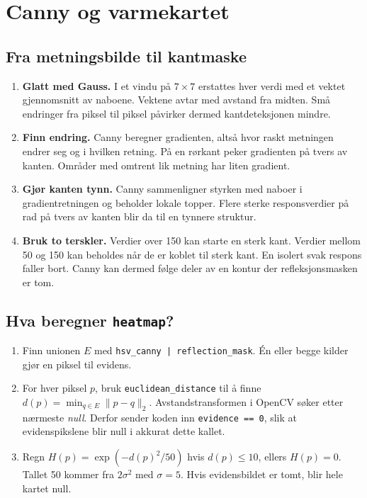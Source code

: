 \documentclass[11pt,a4paper]{article}
\newcommand{\code}[1]{\texttt{#1}}
\newcommand{\norm}[1]{\lVert #1\rVert_2}
\begin{document}
\newpage
\section{Canny og varmekartet}

\subsection*{Fra metningsbilde til kantmaske}
\begin{enumerate}
\item \textbf{Glatt med Gauss.} I et vindu på $7\times7$ erstattes hver verdi med et vektet gjennomsnitt av naboene. Vektene avtar med avstand fra midten. Små endringer fra piksel til piksel påvirker dermed kantdeteksjonen mindre.
\item \textbf{Finn endring.} Canny beregner gradienten, altså hvor raskt metningen endrer seg og i hvilken retning. På en rørkant peker gradienten på tvers av kanten. Områder med omtrent lik metning har liten gradient.
\item \textbf{Gjør kanten tynn.} Canny sammenligner styrken med naboer i gradientretningen og beholder lokale topper. Flere sterke responsverdier på rad på tvers av kanten blir da til en tynnere struktur.
\item \textbf{Bruk to terskler.} Verdier over 150 kan starte en sterk kant. Verdier mellom 50 og 150 kan beholdes når de er koblet til sterk kant. En isolert svak respons faller bort. Canny kan dermed følge deler av en kontur der refleksjonsmasken er tom.
\end{enumerate}

\subsection*{Hva beregner \texttt{heatmap}?}
\begin{enumerate}
\item Finn unionen $E$ med \code{hsv\_canny | reflection\_mask}. Én eller begge kilder gjør en piksel til evidens.
\item For hver piksel $p$, bruk \code{euclidean\_distance} til å finne
$d(p)=\min_{q\in E}\norm{p-q}$. Avstandstransformen i OpenCV søker etter nærmeste \emph{null}. Derfor sender koden inn \code{evidence == 0}, slik at evidenspikslene blir null i akkurat dette kallet.
\item Regn $H(p)=\exp(-d(p)^2/50)$ hvis $d(p)\leq 10$, ellers $H(p)=0$. Tallet 50 kommer fra $2\sigma^2$ med $\sigma=5$. Hvis evidensbildet er tomt, blir hele kartet null.
\end{enumerate}
\end{document}

